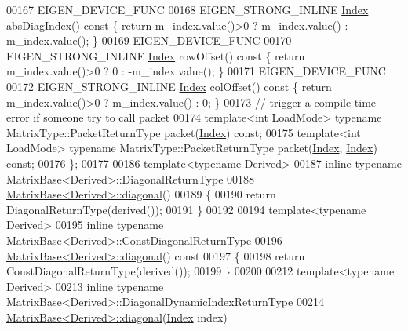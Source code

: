 \begin{DoxyCode}
00167     EIGEN\_DEVICE\_FUNC
00168     EIGEN\_STRONG\_INLINE \hyperlink{namespace_eigen_a62e77e0933482dafde8fe197d9a2cfde}{Index} absDiagIndex()\textcolor{keyword}{ const }\{ \textcolor{keywordflow}{return} m\_index.value()>0 ? m\_index.value() : -
      m\_index.value(); \}
00169     EIGEN\_DEVICE\_FUNC
00170     EIGEN\_STRONG\_INLINE \hyperlink{namespace_eigen_a62e77e0933482dafde8fe197d9a2cfde}{Index} rowOffset()\textcolor{keyword}{ const }\{ \textcolor{keywordflow}{return} m\_index.value()>0 ? 0 : -m\_index.value(); \}
00171     EIGEN\_DEVICE\_FUNC
00172     EIGEN\_STRONG\_INLINE \hyperlink{namespace_eigen_a62e77e0933482dafde8fe197d9a2cfde}{Index} colOffset()\textcolor{keyword}{ const }\{ \textcolor{keywordflow}{return} m\_index.value()>0 ? m\_index.value() : 0; \}
00173     \textcolor{comment}{// trigger a compile-time error if someone try to call packet}
00174     \textcolor{keyword}{template}<\textcolor{keywordtype}{int} LoadMode> \textcolor{keyword}{typename} MatrixType::PacketReturnType packet(\hyperlink{namespace_eigen_a62e77e0933482dafde8fe197d9a2cfde}{Index}) \textcolor{keyword}{const};
00175     \textcolor{keyword}{template}<\textcolor{keywordtype}{int} LoadMode> \textcolor{keyword}{typename} MatrixType::PacketReturnType packet(\hyperlink{namespace_eigen_a62e77e0933482dafde8fe197d9a2cfde}{Index},
      \hyperlink{namespace_eigen_a62e77e0933482dafde8fe197d9a2cfde}{Index}) \textcolor{keyword}{const};
00176 \};
00177 
00186 \textcolor{keyword}{template}<\textcolor{keyword}{typename} Derived>
00187 \textcolor{keyword}{inline} \textcolor{keyword}{typename} MatrixBase<Derived>::DiagonalReturnType
00188 \hyperlink{group___core___module_ab5768147536273eb2dbdfa389cfd26a3}{MatrixBase<Derived>::diagonal}()
00189 \{
00190   \textcolor{keywordflow}{return} DiagonalReturnType(derived());
00191 \}
00192 
00194 \textcolor{keyword}{template}<\textcolor{keyword}{typename} Derived>
00195 \textcolor{keyword}{inline} \textcolor{keyword}{typename} MatrixBase<Derived>::ConstDiagonalReturnType
00196 \hyperlink{group___core___module_ab5768147536273eb2dbdfa389cfd26a3}{MatrixBase<Derived>::diagonal}()\textcolor{keyword}{ const}
00197 \textcolor{keyword}{}\{
00198   \textcolor{keywordflow}{return} ConstDiagonalReturnType(derived());
00199 \}
00200 
00212 \textcolor{keyword}{template}<\textcolor{keyword}{typename} Derived>
00213 \textcolor{keyword}{inline} \textcolor{keyword}{typename} MatrixBase<Derived>::DiagonalDynamicIndexReturnType
00214 \hyperlink{group___core___module_ab5768147536273eb2dbdfa389cfd26a3}{MatrixBase<Derived>::diagonal}(\hyperlink{namespace_eigen_a62e77e0933482dafde8fe197d9a2cfde}{Index} index)

\end{DoxyCode}

